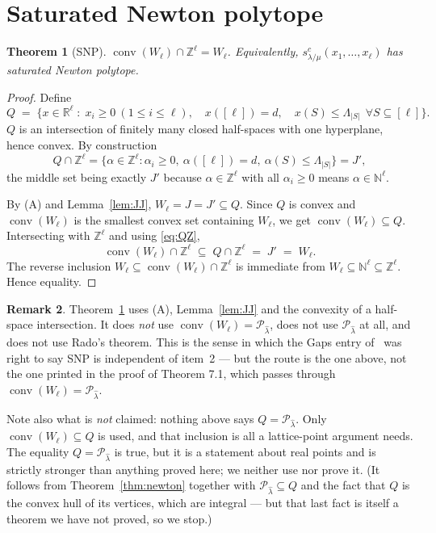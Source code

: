 \documentclass[11pt]{article}
\theoremstyle{plain}
\newtheorem{thm}{Theorem}[section]
\theoremstyle{definition}
\newtheorem{rem}[thm]{Remark}
\DeclareMathOperator{\conv}{conv}
\newcommand{\N}{\mathbb{N}}
\newcommand{\Z}{\mathbb{Z}}
\newcommand{\R}{\mathbb{R}}
\newcommand{\lhat}{\hat\lambda}
\newcommand{\Perm}{\mathcal{P}}
\begin{document}
\section{Saturated Newton polytope}\label{sec:snp}

\begin{thm}[SNP]\label{thm:snp}
$\conv(W_\ell)\cap\Z^{\ell}=W_\ell$. Equivalently,
$s^{c}_{\lambda/\mu}(x_1,\dots,x_\ell)$ has saturated Newton polytope.
\end{thm}

\begin{proof}
Define
\[
  Q\;=\;\bigl\{x\in\R^{\ell}\;:\;x_i\ge 0\ (1\le i\le\ell),\quad x([\ell])=d,
  \quad x(S)\le\Lambda_{|S|}\ \ \forall S\subseteq[\ell]\bigr\}.
\]
$Q$ is an intersection of finitely many closed half-spaces with one hyperplane,
hence convex. By construction
\begin{equation}\label{eq:QZ}
  Q\cap\Z^{\ell}
  =\{\alpha\in\Z^{\ell}:\alpha_i\ge 0,\ \alpha([\ell])=d,\ \alpha(S)\le\Lambda_{|S|}\}
  =J',
\end{equation}
the middle set being exactly $J'$ because $\alpha\in\Z^{\ell}$ with all
$\alpha_i\ge0$ means $\alpha\in\N^{\ell}$.

By (A) and Lemma~\ref{lem:JJ}, $W_\ell=J=J'\subseteq Q$. Since $Q$ is convex and
$\conv(W_\ell)$ is the smallest convex set containing $W_\ell$, we get
$\conv(W_\ell)\subseteq Q$. Intersecting with $\Z^{\ell}$ and using
\eqref{eq:QZ},
\[
  \conv(W_\ell)\cap\Z^{\ell}\;\subseteq\;Q\cap\Z^{\ell}\;=\;J'\;=\;W_\ell .
\]
The reverse inclusion $W_\ell\subseteq\conv(W_\ell)\cap\Z^{\ell}$ is immediate
from $W_\ell\subseteq\N^{\ell}\subseteq\Z^{\ell}$. Hence equality.
\end{proof}

\begin{rem}\label{rem:snpfree}
Theorem~\ref{thm:snp} uses (A), Lemma~\ref{lem:JJ} and the convexity of a
half-space intersection. It does \emph{not} use $\conv(W_\ell)=\Perm_{\lhat}$,
does not use $\Perm_{\lhat}$ at all, and does not use Rado's theorem. This is the
sense in which the Gaps entry of~\cite{note1} was right to say SNP is
independent of item~2 --- but the route is the one above, not the one printed in
the proof of Theorem 7.1, which passes through $\conv(W_\ell)=\Perm_{\lhat}$.

Note also what is \emph{not} claimed: nothing above says $Q=\Perm_{\lhat}$. Only
$\conv(W_\ell)\subseteq Q$ is used, and that inclusion is all a lattice-point
argument needs. The equality $Q=\Perm_{\lhat}$ is true, but it is a statement
about real points and is strictly stronger than anything proved here; we neither
use nor prove it. (It follows from Theorem~\ref{thm:newton} together with
$\Perm_{\lhat}\subseteq Q$ and the fact that $Q$ is the convex hull of its
vertices, which are integral --- but that last fact is itself a theorem we have
not proved, so we stop.)
\end{rem}
\end{document}
